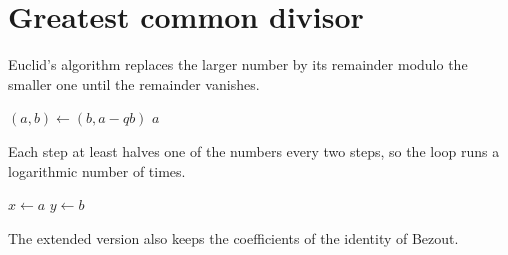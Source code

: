 \documentclass{article}
\begin{document}
\section{Greatest common divisor}
Euclid's algorithm replaces the larger number by its remainder modulo the smaller one until the remainder vanishes.
\begin{algorithm}[H]
\caption{Euclid's algorithm}
\begin{algorithmic}[1]
    \State $(a, b) \gets (b, a - qb)$
  \EndWhile
  \State \Return $a$
\EndFunction
\end{algorithmic}
\end{algorithm}
Each step at least halves one of the numbers every two steps, so the loop runs a logarithmic number of times.

\begin{algorithm}[H]
\begin{algorithmic}
\State $x \gets a$
\State $y \gets b$
\end{algorithmic}
\end{algorithm}

The extended version also keeps the coefficients of the identity of Bezout.
\end{document}
